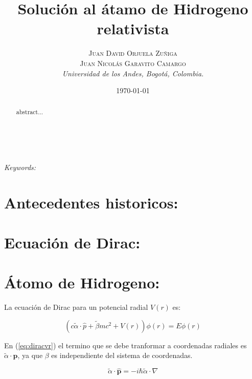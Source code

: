 \documentclass[a4paper, 12pt]{article} %
\title{\textbf{Soluci\'on al \'atamo de Hidrogeno relativista}\\ %
} %
\author{\textsc{Juan David Orjuela Zu\~niga \\ Juan Nicol\'as Garavito Camargo} %
\\{\textit{Universidad de los Andes, Bogot\'a, Colombia.}}} %
\date{\today} %
\makeatletter
\renewcommand{\maketitle}{ %
\begin{flushright} %
{\LARGE\@title} %

\vspace{50pt} %

{\large\@author} %
\\\@date %

\vspace{40pt} %
\end{flushright}
}
\makeatother
\begin{document}
\maketitle %



\begin{abstract}
abstract...
\end{abstract}
\hspace*{3,6mm}\textit{Keywords:}  %

\vspace{30pt} %


\section*{Antecedentes historicos:}

\section*{Ecuaci\'on de Dirac:}

\section*{\'Atomo de Hidrogeno:}

La ecuaci\'on de Dirac para un potencial radial $V(r)$ es:

\begin{equation}\label{eq:diracvr}
(c \widetilde{\alpha} \cdot \hat{p} + \widetilde{\beta} m c^2 + V(r) ) \phi(r) = E \phi (r)
\end{equation}

En (\ref{eq:diracvr}) el termino que se debe tranformar a coordenadas radiales
 es $\widetilde{\alpha} \cdot \hat{\mathbf{p}}$, ya que \textbf{$\beta$} es independiente del 
sistema de coordenadas. 

\begin{equation}\label{alphap}
\widetilde{\alpha} \cdot \hat{\mathbf{p}} = -i \hbar \widetilde{\alpha} \cdot \nabla
\end{equation}
\end{document}
